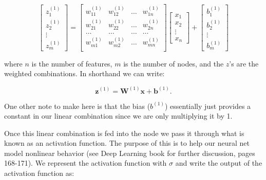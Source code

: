 \[
\begin{bmatrix}
           z^{(1)}_{1} \\
           z^{(1)}_{2} \\
           \vdots \\
           z^{(1)}_{m}
         \end{bmatrix}
         =
\left[
  \begin{array}{cccc}
    w^{(1)}_{11} & w^{(1)}_{12} & \hdots & w^{(1)}_{1n} \\
    w^{(1)}_{21} & w^{(1)}_{22} & \hdots & w^{(1)}_{2n} \\
    \hdots &  \hdots  & \hdots &  \hdots \\
    w^{(1)}_{m1} & w^{(1)}_{m2} & \hdots & w^{(1)}_{mn} \\ 
  \end{array}
\right]
\begin{bmatrix}
           x_{1} \\
           x_{2} \\
           \vdots \\
           x_{n}
         \end{bmatrix}
+
\begin{bmatrix}
           b^{(1)}_{1} \\
           b^{(1)}_{2} \\
           \vdots \\
           b^{(1)}_{m}
         \end{bmatrix}
\]

\noindent where $n$ is the number of features, $m$ is the number of nodes, and the $z$'s are the weighted combinations. In shorthand we can write:

\begin{equation}
\mathbf{z}^{(1)} = \mathbf{W}^{(1)} \mathbf{x} + \mathbf{b}^{(1)}.
\end{equation}

One other note to make here is that the bias ($b^{(1)}$) essentially just provides a constant in our linear combination since we are only multiplying it by 1. 

Once this linear combination is fed into the node we pass it through what is known as an activation function. The purpose of this is to help our neural net model nonlinear behavior (see Deep Learning book for further discussion, pages 168-171). We represent the activation function with $\sigma$ and write the output of the activation function as:

